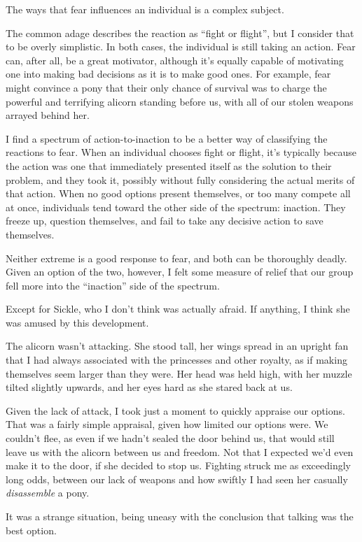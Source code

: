 The ways that fear influences an individual is a complex subject.

The common adage describes the reaction as “fight or flight”, but I consider that to be overly simplistic. In both cases, the individual is still taking an action. Fear can, after all, be a great motivator, although it’s equally capable of motivating one into making bad decisions as it is to make good ones. For example, fear might convince a pony that their only chance of survival was to charge the powerful and terrifying alicorn standing before us, with all of our stolen weapons arrayed behind her.

I find a spectrum of action-to-inaction to be a better way of classifying the reactions to fear. When an individual chooses fight or flight, it’s typically because the action was one that immediately presented itself as the solution to their problem, and they took it, possibly without fully considering the actual merits of that action. When no good options present themselves, or too many compete all at once, individuals tend toward the other side of the spectrum: inaction. They freeze up, question themselves, and fail to take any decisive action to save themselves.

Neither extreme is a good response to fear, and both can be thoroughly deadly. Given an option of the two, however, I felt some measure of relief that our group fell more into the “inaction” side of the spectrum.

Except for Sickle, who I don’t think was actually afraid. If anything, I think she was amused by this development.

The alicorn wasn’t attacking. She stood tall, her wings spread in an upright fan that I had always associated with the princesses and other royalty, as if making themselves seem larger than they were. Her head was held high, with her muzzle tilted slightly upwards, and her eyes hard as she stared back at us.

Given the lack of attack, I took just a moment to quickly appraise our options. That was a fairly simple appraisal, given how limited our options were. We couldn’t flee, as even if we hadn’t sealed the door behind us, that would still leave us with the alicorn between us and freedom. Not that I expected we’d even make it to the door, if she decided to stop us. Fighting struck me as exceedingly long odds, between our lack of weapons and how swiftly I had seen her casually \textit{disassemble} a pony.

It was a strange situation, being uneasy with the conclusion that talking was the best option.


